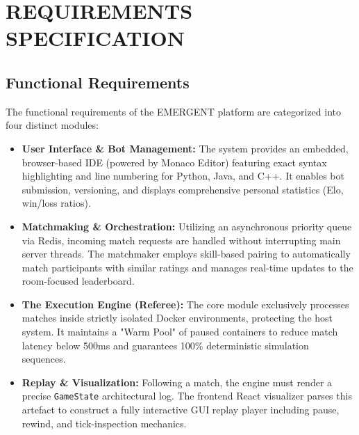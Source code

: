 \documentclass[12pt,a4paper]{report}
\begin{document}
\section{REQUIREMENTS SPECIFICATION}

\subsection{Functional Requirements}
The functional requirements of the EMERGENT platform are categorized into four distinct modules:
\begin{itemize}
    \item \textbf{User Interface \& Bot Management:} The system provides an embedded, browser-based IDE (powered by Monaco Editor) featuring exact syntax highlighting and line numbering for Python, Java, and C++. It enables bot submission, versioning, and displays comprehensive personal statistics (Elo, win/loss ratios).
    \item \textbf{Matchmaking \& Orchestration:} Utilizing an asynchronous priority queue via Redis, incoming match requests are handled without interrupting main server threads. The matchmaker employs skill-based pairing to automatically match participants with similar ratings and manages real-time updates to the room-focused leaderboard.
    \item \textbf{The Execution Engine (Referee):} The core module exclusively processes matches inside strictly isolated Docker environments, protecting the host system. It maintains a "Warm Pool" of paused containers to reduce match latency below 500ms and guarantees 100\% deterministic simulation sequences.
    \item \textbf{Replay \& Visualization:} Following a match, the engine must render a precise \texttt{GameState} architectural log. The frontend React visualizer parses this artefact to construct a fully interactive GUI replay player including pause, rewind, and tick-inspection mechanics.
\end{itemize}
\end{document}
